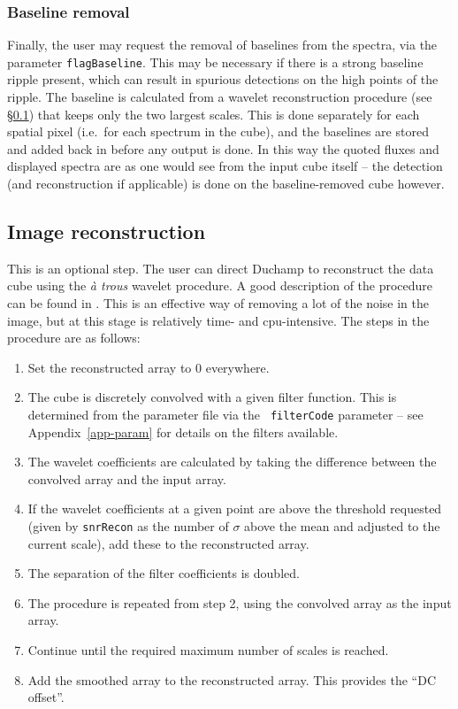 \documentclass[12pt]{article}
\newcommand{\ie}{i.e.\ }
\begin{document}
\subsubsection{Baseline removal}

Finally, the user may request the removal of baselines from the
spectra, via the parameter {\tt flagBaseline}. This may be necessary
if there is a strong baseline ripple present, which can result in
spurious detections on the high points of the ripple. The baseline is
calculated from a wavelet reconstruction procedure (see
\S\ref{sec-recon}) that keeps only the two largest scales. This is
done separately for each spatial pixel (\ie for each spectrum in the
cube), and the baselines are stored and added back in before any
output is done. In this way the quoted fluxes and displayed spectra
are as one would see from the input cube itself -- the detection (and
reconstruction if applicable) is done on the baseline-removed cube
however.

\subsection{Image reconstruction}
\label{sec-recon}

This is an optional step. The user can direct Duchamp to
reconstruct the data cube using the {\it {\`a} trous} wavelet
procedure. A good description of the procedure can be found in
\citet{starck02:book}. This is an effective way of removing a
lot of the noise in the image, but at this stage is relatively time-
and cpu-intensive. The steps in the procedure are as follows:
\begin{enumerate}
\item Set the reconstructed array to 0 everywhere.
\item The cube is discretely convolved with a given filter
  function. This is determined from the parameter file via the {\tt
  filterCode} parameter -- see Appendix~\ref{app-param} for details on
  the filters available.
\item The wavelet coefficients are calculated by taking the difference
  between the convolved array and the input array.
\item If the wavelet coefficients at a given point are above the
  threshold requested (given by {\tt snrRecon} as the number of
  $\sigma$ above the mean and adjusted to the current scale), add
  these to the reconstructed array.
\item The separation of the filter coefficients is doubled.
\item The procedure is repeated from step 2, using the convolved array
  as the input array.
\item Continue until the required maximum number of scales is reached.
\item Add the smoothed array to the reconstructed array. This provides
  the ``DC offset''.
\end{enumerate}
\end{document}
